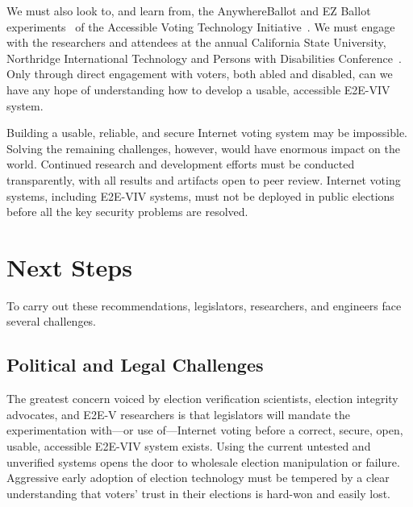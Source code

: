 We must also look to, and learn from, the AnywhereBallot and EZ Ballot
experiments~\cite{AnywhereBallot,lee2012ez} of the Accessible Voting
Technology Initiative~\cite{AVTI}.  We must engage with the
researchers and attendees at the annual California State University,
Northridge International Technology and Persons with Disabilities
Conference~\cite{CSUN}. Only through direct engagement with voters,
both abled and disabled, can we have any hope of understanding how to
develop a usable, accessible E2E-VIV system.


Building a usable, reliable, and secure Internet voting system may be
impossible. Solving the remaining challenges, however, would have
enormous impact on the world. Continued research and development
efforts must be conducted transparently, with all results and
artifacts open to peer review. Internet voting systems, including
E2E-VIV systems, must not be deployed in public elections before all
the key security problems are resolved.

\section{Next Steps}
\label{sec:next-steps}

To carry out these recommendations, legislators, researchers, and
engineers face several challenges.

\subsection{Political and Legal Challenges}

The greatest concern voiced by election verification scientists,
election integrity advocates, and E2E-V researchers is that
legislators will mandate the experimentation with---or use
of---Internet voting before a correct, secure, open, usable,
accessible E2E-VIV system exists. Using the current untested and
unverified systems opens the door to wholesale election manipulation
or failure. Aggressive early adoption of election technology must be
tempered by a clear understanding that voters' trust in their
elections is hard-won and easily lost.

